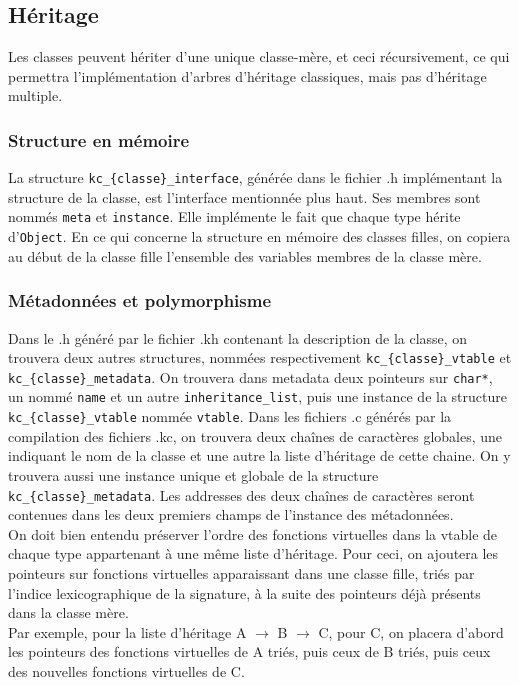 \documentclass[12pt,a4paper]{article}
\def\code#1{\texttt{#1}}
\begin{document}
\begin{NoHyper}
\subsection{Héritage}
Les classes peuvent hériter d'une unique classe-mère, et ceci récursivement, ce qui permettra l'implémentation d'arbres d'héritage classiques, mais pas d'héritage multiple.
\subsubsection{Structure en mémoire}
La structure \code{kc\_\{classe\}\_interface}, générée dans le fichier .h implémentant la structure de la classe, est l'interface mentionnée plus haut. Ses membres sont nommés \code{meta} et \code{instance}. Elle implémente le fait que chaque type hérite d'\code{Object}. En ce qui concerne la structure en mémoire des classes filles, on copiera au début de la classe fille l'ensemble des variables membres de la classe mère.

\subsubsection{Métadonnées et polymorphisme}
Dans le .h généré par le fichier .kh contenant la description de la classe, on trouvera deux autres structures, nommées respectivement \code{kc\_\{classe\}\_vtable} et \code{kc\_\{classe\}\_metadata}. On trouvera dans metadata deux pointeurs sur \code{char*}, un nommé \code{name} et un autre \code{inheritance\_list}, puis une instance de la structure \code{kc\_\{classe\}\_vtable} nommée \code{vtable}. Dans les fichiers .c générés par la compilation des fichiers .kc, on trouvera deux chaînes de caractères globales, une indiquant le nom de la classe et une autre la liste d'héritage de cette chaine. On y trouvera aussi une instance unique et globale de la structure \code{kc\_\{classe\}\_metadata}. Les addresses des deux chaînes de caractères seront contenues dans les deux premiers champs de l'instance des métadonnées. \\

On doit bien entendu préserver l'ordre des fonctions virtuelles dans la vtable de chaque type appartenant à une même liste d'héritage. Pour ceci, on ajoutera les pointeurs sur fonctions virtuelles apparaissant dans une classe fille, triés par l'indice lexicographique de la signature, à la suite des pointeurs déjà présents dans la classe mère.\\
Par exemple, pour la liste d'héritage A $\rightarrow$ B $\rightarrow$ C, pour C, on placera d'abord les pointeurs des fonctions virtuelles de A triés, puis ceux de B triés, puis ceux des nouvelles fonctions virtuelles de C.\\


\end{NoHyper}
\end{document}
